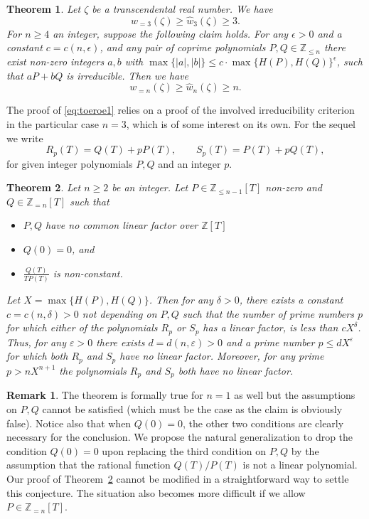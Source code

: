\documentclass[12pt]{amsart}
\newtheorem{theorem}{Theorem}[section]
\theoremstyle{definition}
\newtheorem{remark}{Remark}
\begin{document}
\begin{theorem} \label{basned}
Let $\zeta$ be a transcendental real number. We have 
%
\begin{equation} \label{eq:toeroe1}
w_{=3}(\zeta)\geq \widehat{w}_{3}(\zeta)\geq 3.
\end{equation}
%
For $n\geq 4$ an integer,
suppose the following claim holds. 
For any $\epsilon>0$ and a constant $c=c(n,\epsilon)$,
and any pair of coprime
polynomials $P,Q\in\mathbb{Z}_{\leq n}$ 
there exist non-zero integers $a,b$ with 
$\max\{\vert a\vert, \vert b\vert\}\leq c\cdot\max\{ H(P),H(Q)\}^{\epsilon}$,
such that $aP+bQ$ is irreducible. Then we have
%
\begin{equation} \label{eq:toeroe}
w_{=n}(\zeta)\geq \widehat{w}_{n}(\zeta)\geq n.
\end{equation}
%
\end{theorem}

The proof of \eqref{eq:toeroe1} relies on a proof of the involved irreducibility criterion
in the particular case $n=3$, which is of some interest on its own. 
For the sequel we write
%
\[
R_{p}(T)=Q(T)+pP(T), \qquad S_{p}(T)=P(T)+pQ(T),
\]
%
for given integer polynomials $P,Q$ and an integer $p$. 

\begin{theorem} \label{irrpol}
Let $n\geq 2$ be an integer. Let
$P\in\mathbb{Z}_{\leq n-1}[T]$ non-zero and
$Q\in\mathbb{Z}_{=n}[T]$ such that
%
\begin{itemize}

\item $P,Q$ have no common
linear factor over $\mathbb{Z}[T]$
\item $Q(0)=0$, and
\item  $\frac{Q(T)}{TP(T)}$ is non-constant.

\end{itemize}
%
Let $X=\max\{ H(P),H(Q)\}$.
Then for any $\delta>0$, there exists a constant
$c=c(n,\delta)>0$ not depending on $P,Q$
such that the number of prime numbers $p$ for which 
either of the polynomials
$R_{p}$ or $S_{p}$ has a linear factor, is less
than $cX^{\delta}$. Thus,
for any $\varepsilon>0$ there exists $d=d(n,\varepsilon)>0$
and a prime number 
$p\leq dX^{\varepsilon}$ for which both
$R_{p}$ and $S_{p}$ have no linear factor.
Moreover, for any prime $p>nX^{n+1}$ the polynomials $R_{p}$ and $S_{p}$ both have no linear factor.
\end{theorem}

\begin{remark}
The theorem is formally true for $n=1$ as well but 
the assumptions on $P,Q$
cannot be satisfied (which must be the case as the
claim is obviously false). Notice also that when $Q(0)=0$,
the other two conditions are clearly necessary for the conclusion. 
We propose the natural generalization
to drop the condition $Q(0)=0$ upon replacing
the third condition on $P,Q$ by the assumption 
that the rational function $Q(T)/P(T)$ is not 
a linear polynomial. Our proof of Theorem~\ref{irrpol}
cannot be modified in a straightforward
way to settle this conjecture. The situation also
becomes more difficult if we allow $P\in\mathbb{Z}_{=n}[T]$.
\end{remark}
\end{document}
